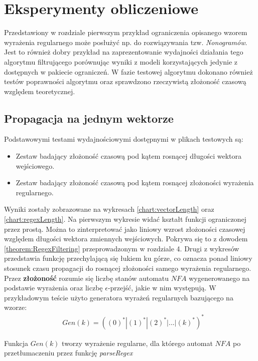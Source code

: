 \chapter{Eksperymenty obliczeniowe}
\thispagestyle{chapterBeginStyle}
Przedstawiony w rozdziale pierwszym przykład ograniczenia opisanego wzorem wyrażenia regularnego może posłużyć np. do rozwiązywania
tzw. \textit{Nonogramów}. Jest to również dobry przykład na zaprezentowanie wydajności działania tego algorytmu filtrującego
porównując wyniki z modeli korzystających jedynie z dostępnych w pakiecie ograniczeń. W fazie testowej algorytmu dokonano również
testów poprawności algorytmu oraz sprawdzono rzeczywistą złożoność czasową względem teoretycznej.


\section{Propagacja na jednym wektorze}
\par
Podstawowymi testami wydajnościowymi dostępnymi w plikach testowych są:
\begin{itemize}
  \item Zestaw badający złożoność czasową pod kątem rosnącej długości wektora wejściowego.
  \item Zestaw badający złożoność czasową pod kątem rosnącej złożoności wyrażenia regularnego.
\end{itemize}
\par
Wyniki zostały zobrazowane na wykresach \ref{chart:vectorLength} oraz \ref{chart:regexLength}. Na pierwszym wykresie widać
kształt funkcji ograniczonej przez prostą. Można to zinterpretować jako liniowy wzrost złożoności czasowej względem długości
wektora zmiennych wejściowych. Pokrywa się to z dowodem \ref{theorem:RegexFiltering} przeprowadzonym w rozdziale 4. Drugi z wykresów przedstawia
funkcję przechylającą się łukiem ku górze, co oznacza ponad liniowy stosunek czasu propagacji do rosnącej złożoności samego wyrażenia regularnego.
Przez \textbf{złożoność} rozumie się liczbę stanów automatu $NFA$ wygenerowanego na podstawie wyrażenia oraz liczbę $\epsilon$-przejść,
jakie w nim występują. W przykładowym teście użyto generatora wyrażeń regularnych bazującego na wzorze:
\begin{equation}
\begin{aligned}
  & Gen(k) =( (0)^* | (1)^* | (2)^* | ... | (k)^* )^*
\end{aligned}
\end{equation}
\par
Funkcja $Gen(k)$ tworzy wyrażenie regularne, dla którego automat $NFA$ po przetłumaczeniu przez funkcję \textit{parseRegex}
